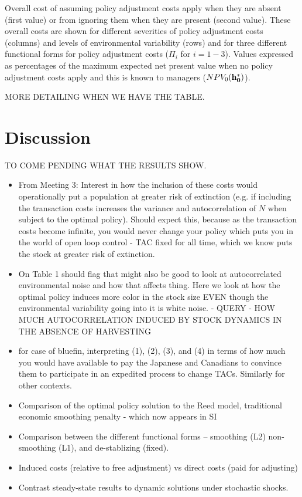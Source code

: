 \documentclass{article}\usepackage{graphicx, color}
\begin{document}
Overall cost of assuming policy adjustment costs apply when they are absent (first value) or from ignoring them when they are present (second value). These overall costs are shown for different severities of policy adjustment costs (columns) and levels of environmental variability (rows) and for three different functional forms for policy adjustment costs ($\Pi_i$ for $ i=1-3$). Values expressed as percentages of the maximum expected net present value when no policy adjustment costs apply and this is known to managers ($ NPV_0 ({\bf h_0^*}) $). 


MORE DETAILING WHEN WE HAVE THE TABLE.

\section{Discussion}
TO COME PENDING WHAT THE RESULTS SHOW.
\begin{itemize}
\item From Meeting 3: Interest in how the inclusion of these costs would operationally put a population at greater risk of extinction (e.g. if including the transaction costs increases the variance and autocorrelation of $N$ when subject to the optimal policy). Should expect this, because as the transaction costs become infinite, you would never change your policy which puts you in the world of open loop control - TAC fixed for all time, which we know puts the stock at greater risk of extinction.
\item On Table 1 should flag that might also be good to look at autocorrelated environmental noise and how that affects thing. Here we look at how the optimal policy induces more color in the stock size EVEN though the environmental variability going into it is white noise. - QUERY - HOW MUCH AUTOCORRELATION INDUCED BY STOCK DYNAMICS IN THE ABSENCE OF HARVESTING
\item for case of bluefin, interpreting  (1), (2), (3), and (4) in terms of how much you would have available to pay the Japanese and Canadians to convince them to participate in an expedited process to change TACs. Similarly for other contexts.
\item   Comparison of the optimal policy solution to the Reed model, traditional economic smoothing penalty - which now appears in SI
\item  Comparison between the different functional forms -- smoothing (L2)
  non-smoothing (L1), and de-stablizing (fixed).
\item   Induced costs (relative to free adjustment) vs direct costs (paid for adjusting) 
\item   Contrast steady-state results to dynamic solutions under stochastic shocks.
\end{itemize}
\end{document}
